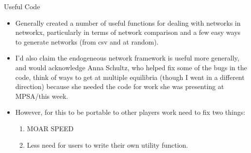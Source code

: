 \documentclass{beamer}
\begin{document}
\begin{frame}{Useful Code}
\begin{itemize}
\item Generally created a number of useful functions for dealing with networks in networkx, particularly in terms of network comparison and a few easy ways to generate networks (from csv and at random).
\item I'd also claim the endogeneous network framework is useful more generally, and would acknowledge Anna Schultz, who helped fix some of the bugs in the code, think of ways to get at multiple equilibria (though I went in a different direction) because she needed the code for work she was presenting at MPSA/this week.
\item However, for this to be portable to other players work need to fix two things:
\begin{enumerate}
\item MOAR SPEED
\item Less need for users to write their own utility function.
\end{enumerate}
\end{itemize}
\end{frame}
\end{document}

